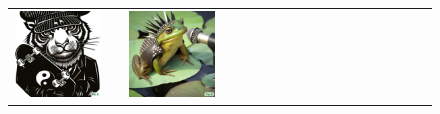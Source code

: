 \begin{figure}[ht!]
\begin{adjustwidth}{-0.8in}{-0.5in}
\begin{tabular}{cccccccccccccccccccc}
\multicolumn{2}{c}{\includegraphics[width=\threebythreecolwidth\textwidth]{figures/cherries/tiger6.jpg}} &&
\multicolumn{2}{c}{\includegraphics[width=\threebythreecolwidth\textwidth]{figures/cherries/rock_frog_0.jpg}} &

\end{tabular}
\end{adjustwidth}
\end{figure}
